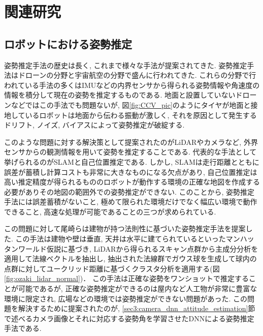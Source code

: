 \chapter{関連研究}
\section{ロボットにおける姿勢推定}\label{sec3:attitude_estimation_for_robot}
姿勢推定手法の歴史は長く, これまで様々な手法が提案されてきた\cite{attitude_estimation_survey1}\cite{attitude_estimation_survey2}. 姿勢推定手法はドローンの分野\cite{drone_attitude_estimation1}\cite{drone_attitude_estimation2}\cite{drone_attitude_estimation3}と宇宙航空の分野\cite{airplane_attitude_estimation1}\cite{airplane_attitude_estimation2}\cite{airplane_attitude_estimation3}で盛んに行われてきた. これらの分野で行われている手法の多くはIMUなどの内界センサから得られる姿勢情報や角速度の情報を積分して現在の姿勢を推定するものである. 地面と設置していないドローンなどではこの手法でも問題ないが, 図\ref{fig:CCV_pic}のようにタイヤが地面と接地しているロボットは地面から伝わる振動が激しく, それを原因として発生するドリフト, ノイズ, バイアスによって姿勢推定が破綻する. \par
このような問題に対する解決策として提案されたのがLiDARやカメラなど, 外界センサからの観測情報を用いて姿勢を推定することである. 代表的な手法として挙げられるのがSLAM\cite{SLAM_attitude_estimation}\cite{ORB_SLAM}\cite{LIO-SAM}\cite{Cartgrapher}と自己位置推定\cite{Particle_Filter}\cite{NDT_Localization}\cite{EKF_Localization}である. しかし, SLAMは走行距離とともに誤差が蓄積し計算コストも非常に大きなものになる欠点があり, 自己位置推定は高い推定精度が得られるもののロボットが動作する環境の正確な地図を作成する必要がありその地図の範囲外での姿勢推定ができない. このことから, 姿勢推定手法には誤差蓄積がないこと, 極めて限られた環境だけでなく幅広い環境で動作できること, 高速な処理が可能であることの三つが求められている.\par
この問題に対して尾崎らは建物が持つ法則性に基づいた姿勢推定手法を提案した\cite{ozaki_lidar_normal}. この手法は建物や壁は垂直, 天井は水平に建てられているといったマンハッタンワールド仮説\cite{マンハッタンワールド仮説}に基づき, LiDARから得られるスキャン点群から主成分分析\cite{PCA_Normal}を適用して法線ベクトルを抽出し, 抽出された法線群でガウス球\cite{Gauss_Sphere}を生成して球内の点群に対してユークリッド距離に基づくクラスタ分析を適用する(図\ref{fig:ozaki_lidar_normal})． この手法は正確な姿勢をワンショットで推定することが可能であるが, 正確な姿勢推定ができるのは屋内など人工物が非常に豊富な環境に限定され, 広場などの環境では姿勢推定ができない問題があった. この問題を解決するために提案されたのが, \ref{sec3:camera_dnn_attitude_estimation}節で述べるカメラ画像とそれに対応する姿勢角を学習させたDNNによる姿勢推定手法である.

